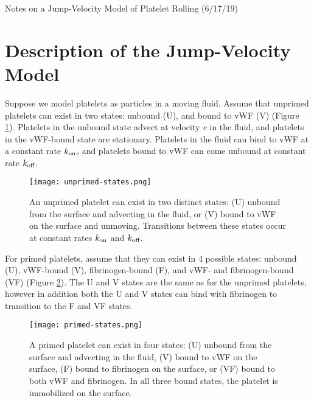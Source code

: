 \documentclass{article}
\newcommand{\tn}{\textnormal}
\begin{document}
\pagestyle{plain}

\begin{center}
  {\Large Notes on a Jump-Velocity Model of Platelet Rolling (6/17/19)}
\end{center}

\section{Description of the Jump-Velocity Model}
\label{sec:jump-vel}

Suppose we model platelets as particles in a moving fluid. Assume that
unprimed platelets can exist in two states: unbound (U), and bound to
vWF (V) (Figure \ref{fig:unprimed-states}). Platelets in the unbound
state advect at velocity $v$ in the fluid, and platelets in the
vWF-bound state are stationary. Platelets in the fluid can bind to vWF
at a constant rate $k_\tn{on}$, and platelets bound to vWF can come
unbound at constant rate $k_\tn{off}$.

\begin{figure}
  \centering
  \texttt{[image: unprimed-states.png]}
  \caption[Possible states of unprimed platelets]{An unprimed platelet
    can exist in two distinct states: (U) unbound from the surface and
    advecting in the fluid, or (V) bound to vWF on the surface and
    unmoving. Transitions between these states occur at constant rates
    $k_\tn{on}$ and $k_\tn{off}$.}
  \label{fig:unprimed-states}
\end{figure}

For primed platelets, assume that they can exist in 4 possible states:
unbound (U), vWF-bound (V), fibrinogen-bound (F), and vWF- and
fibrinogen-bound (VF) (Figure \ref{fig:primed-states}). The U and V
states are the same as for the unprimed platelets, however in addition
both the U and V states can bind with fibrinogen to transition to the
F and VF states.

\begin{figure}
  \centering
  \texttt{[image: primed-states.png]}
  \caption[Possible states of primed platelets]{A primed platelet can
    exist in four states: (U) unbound from the surface and advecting
    in the fluid, (V) bound to vWF on the surface, (F) bound to
    fibrinogen on the surface, or (VF) bound to both vWF and
    fibrinogen. In all three bound states, the platelet is immobilized
    on the surface.}
  \label{fig:primed-states}
\end{figure}
\end{document}
